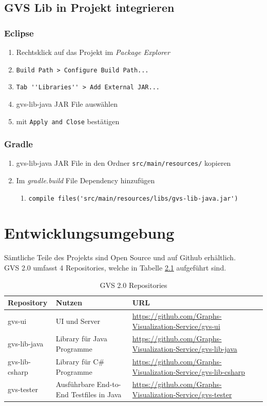 \documentclass[11pt,a4paper,english,oneside]{book}
\numberwithin{equation}{chapter}
\begin{document}
	\section{GVS Lib in Projekt integrieren}
	\subsection{Eclipse}
	\begin{enumerate}
		\item Rechtsklick auf das Projekt im \textit{Package Explorer}
		\item \lstinline{Build Path > Configure Build Path...}
		\item \lstinline{Tab ''Libraries'' > Add External JAR...}
		\item gvs-lib-java JAR File auswählen
		\item mit \lstinline{Apply and Close} bestätigen
	\end{enumerate}

	\subsection{Gradle}
	\begin{enumerate}
		\item gvs-lib-java JAR File in den Ordner \lstinline{src/main/resources/} kopieren
		\item Im \textit{gradle.build} File Dependency hinzufügen
		\begin{enumerate}
			\item \lstinline{compile files('src/main/resources/libs/gvs-lib-java.jar')}
		\end{enumerate}
	\end{enumerate}
	
	\chapter{Entwicklungsumgebung}
	Sämtliche Teile des Projekts sind Open Source und auf Github erhältlich.
	\\
	GVS 2.0 umfasst 4 Repositories, welche in Tabelle \ref{tbl:repos} aufgeführt sind.
	
	\begin{table}[h!]
		\centering
		\begin{tabularx}{\linewidth}{l l X}
			\toprule 
			Repository & Nutzen & URL \\
			\midrule
			gvs-ui & UI und Server & \url{https://github.com/Graphs-Visualization-Service/gvs-ui}  \\
			gvs-lib-java & Library für Java Programme & \url{https://github.com/Graphs-Visualization-Service/gvs-lib-java} \\
			gvs-lib-csharp & Library für C\# Programme & \url{https://github.com/Graphs-Visualization-Service/gvs-lib-csharp} \\
			gvs-tester & Ausführbare End-to-End Testfiles in Java & \url{https://github.com/Graphs-Visualization-Service/gvs-tester} \\
			\bottomrule 
		\end{tabularx} 
		\caption{GVS 2.0 Repositories} 
		\label{tbl:repos}
	\end{table}
\end{document}
